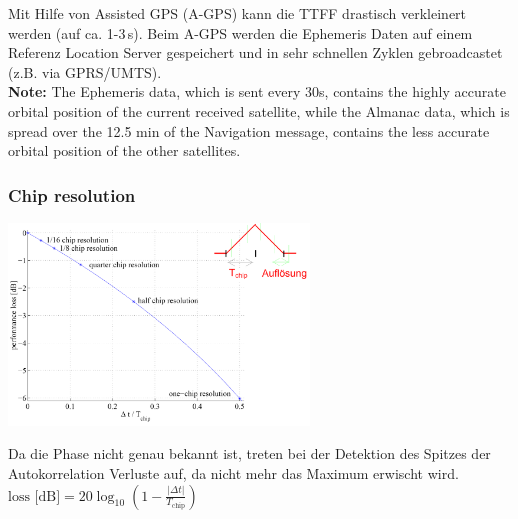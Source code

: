 	Mit Hilfe von Assisted GPS (A-GPS) kann die TTFF drastisch verkleinert werden (auf ca. 1-3\,s). Beim A-GPS werden die 
	Ephemeris Daten auf einem Referenz Location Server gespeichert und in sehr schnellen Zyklen gebroadcastet (z.B. via GPRS/UMTS). \\
	
	\textbf{Note:} The Ephemeris data, which is sent every 30s, contains the highly accurate orbital position of the 
	current received satellite, while the Almanac data, which is spread over the 12.5 min of the Navigation message, 
	contains the less accurate orbital position of the other satellites.
	
\subsubsection{Chip resolution}
	\begin{minipage}{10cm}
	    \includegraphics[width=8cm]{./bilder/GPS-ChipResolution.png}
    \end{minipage}
	\begin{minipage}{8cm}
    	Da die Phase nicht genau bekannt ist, treten bei der Detektion des
		Spitzes der Autokorrelation Verluste auf, da nicht mehr das Maximum erwischt
		wird.\\
		$\text{loss [dB]}= 20 \log_{10}\left(1-\frac{|\Delta
		t|}{T_{\mathrm{chip}}}\right)$\\
    \end{minipage}
